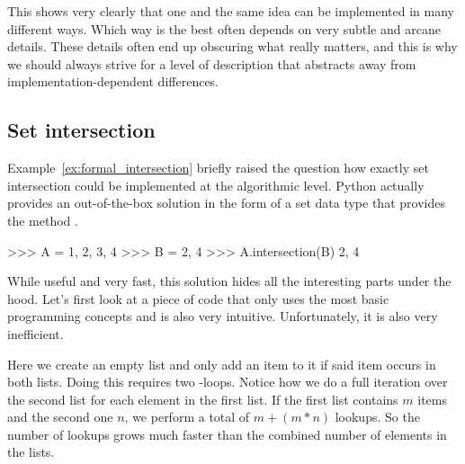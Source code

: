 This shows very clearly that one and the same idea can be implemented in many different ways.
Which way is the best often depends on very subtle and arcane details. 
These details often end up obscuring what really matters, and this is why we should always strive for a level of description that abstracts away from implementation-dependent differences.



\subsection{Set intersection}
\label{ssec:formal_code_setintersection}

Example~\ref{ex:formal_intersection} briefly raised the question how exactly set intersection could be implemented at the algorithmic level.
Python actually provides an out-of-the-box solution in the form of a set data type that provides the method .

\begin{center}
    \begin{pythoncode}
    >>> A = {1, 2, 3, 4}
    >>> B = {2, 4}
    >>> A.intersection(B)
    {2, 4}
    \end{pythoncode}
\end{center}

While useful and very fast, this solution hides all the interesting parts under the hood.
Let's first look at a piece of code that only uses the most basic programming concepts and is also very intuitive.
Unfortunately, it is also very inefficient.

\begin{center}
\end{center}

Here we create an empty list and only add an item to it if said item occurs in both lists.
Doing this requires two -loops.
Notice how we do a full iteration over the second list for each element in the first list.
If the first list contains $m$ items and the second one $n$, we perform a total of $m + (m * n)$ lookups.
So the number of lookups grows much faster than the combined number of elements in the lists.

